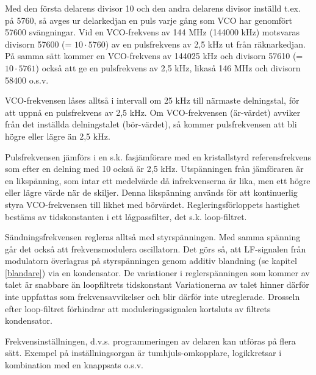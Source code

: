 Med den första delarens divisor 10 och den andra delarens divisor
inställd t.ex. på 5760, så avges ur delarkedjan en puls varje gång som
VCO har genomfört 57600 svängningar. Vid en VCO-frekvens av 144 MHz
(144000 kHz) motsvaras divisorn 57600 (= \(10 \cdot 5760\)) av en
pulsfrekvens av 2,5 kHz ut från räknarkedjan. På samma sätt kommer en
VCO-frekvens av 144025 kHz och divisorn 57610 (= \(10 \cdot 5761\))
också att ge en pulsfrekvens av 2,5 kHz, likaså 146 MHz och divisorn
58400 o.s.v.

VCO-frekvensen låses alltså i intervall om 25 kHz till närmaste
delningstal, för att uppnå en pulsfrekvens av 2,5 kHz. Om
VCO-frekvensen (är-värdet) avviker från det inställda delningstalet
(bör-värdet), så kommer pulsfrekvensen att bli högre eller lägre än
2,5 kHz.

Pulsfrekvensen jämförs i en s.k. fasjämförare med en kristallstyrd
referensfrekvens som efter en delning med 10 också är 2,5
kHz. Utspänningen från jämföraren är en likspänning, som intar ett
medelvärde då infrekvenserna är lika, men ett högre eller lägre värde
när de skiljer. Denna likspänning används för att kontinuerlig styra
VCO-frekvensen till likhet med börvärdet. Regleringsförloppets
hastighet bestäms av tidskonstanten i ett lågpassfilter, det
s.k. loop-filtret.

Sändningsfrekvensen regleras alltså med styrspänningen. Med samma
spänning går det också att frekvensmodulera oscillatorn.  Det görs så,
att LF-signalen från modulatorn överlagras på styrspänningen genom
additiv blandning (se kapitel \ref{blandare}) via en kondensator. De
variationer i reglerspänningen som kommer av talet är snabbare än
loopfiltrets tidskonstant Variationerna av talet hinner därför inte
uppfattas som frekvensavvikelser och blir därför inte utreglerade.
Drosseln efter loop-filtret förhindrar att moduleringssignalen
kortsluts av filtrets kondensator.

Frekvensinställningen, d.v.s. programmeringen av delaren kan utföras
på flera sätt. Exempel på inställningsorgan är tumhjuls-omkopplare,
logikkretsar i kombination med en knappsats o.s.v.

